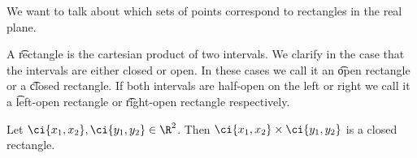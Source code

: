 

We want to talk about which sets of points correspond to rectangles in the real plane.


A \t{rectangle} is the cartesian product of two intervals.
We clarify in the case that the intervals are either closed or open.
In these cases we call it an \t{open rectangle} or a \t{closed rectangle}.
If both intervals are half-open on the left or right we call it a \t{left-open rectangle} or \t{right-open rectangle} respectively.


Let $\ci{x_1, x_2},\ci{y_1,y_2}\in\R ^2$.
Then $\ci{x_1, x_2} \times \ci{y_1,y_2}$ is a closed rectangle.

\blankpage
